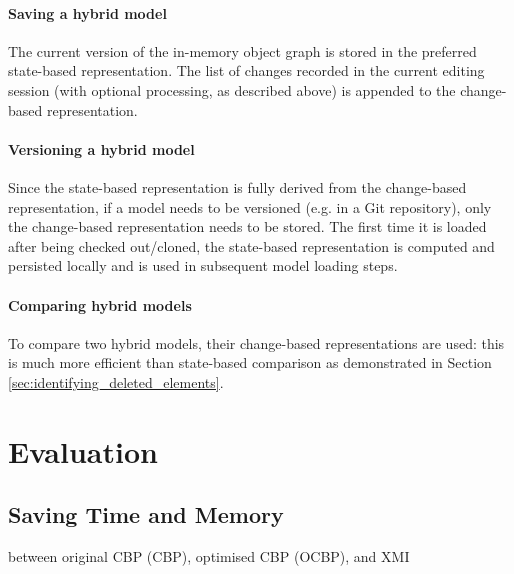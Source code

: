 \documentclass[sigplan,review,anonymous]{acmart}\settopmatter{printfolios=true,printccs=false,printacmref=false}
\begin{document}
\paragraph{Saving a hybrid model} The current version of the in-memory object graph is stored in the preferred state-based representation. The list of changes recorded in the current editing session (with optional processing, as described above) is appended to the change-based representation.

\paragraph{Versioning a hybrid model} Since the state-based representation is fully derived from the change-based representation, if a model needs to be versioned (e.g. in a Git repository), only the change-based representation needs to be stored. The first time it is loaded after being checked out/cloned, the state-based representation is computed and persisted locally and is used in subsequent model loading steps.

\paragraph{Comparing hybrid models} To compare two hybrid models, their change-based representations are used: this is much more efficient than state-based comparison as demonstrated in Section \ref{sec:identifying_deleted_elements}.

%


\section{Evaluation}

\subsection{Saving Time and Memory}

between original CBP (CBP), optimised CBP (OCBP), and XMI
\end{document}
